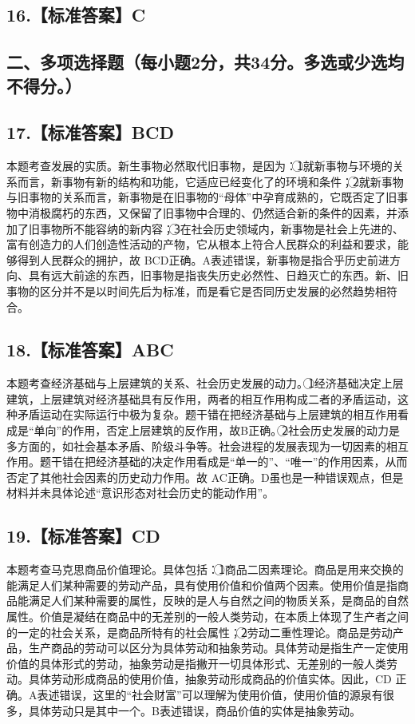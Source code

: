 \documentclass[UTF8,11pt]{ctexart}
\begin{document}
\subsection*{16.【标准答案】C}

\subsection*{二、多项选择题（每小题2分，共34分。多选或少选均不得分。）}

\subsection*{17.【标准答案】BCD}

本题考查发展的实质。新生事物必然取代旧事物，是因为：\textcircled{1}就新事物与环境的关系而言，新事物有新的结构和功能，它适应已经变化了的环境和条件；\textcircled{2}就新事物与旧事物的关系而言，新事物是在旧事物的“母体”中孕育成熟的，它既否定了旧事物中消极腐朽的东西，又保留了旧事物中合理的、仍然适合新的条件的因素，并添加了旧事物所不能容纳的新内容；\textcircled{3}在社会历史领域内，新事物是社会上先进的、富有创造力的人们创造性活动的产物，它从根本上符合人民群众的利益和要求，能够得到人民群众的拥护，故 BCD正确。A表述错误，新事物是指合乎历史前进方向、具有远大前途的东西，旧事物是指丧失历史必然性、日趋灭亡的东西。新、旧事物的区分并不是以时间先后为标准，而是看它是否同历史发展的必然趋势相符合。


\subsection*{18.【标准答案】ABC}

本题考查经济基础与上层建筑的关系、社会历史发展的动力。\textcircled{1}经济基础决定上层建筑，上层建筑对经济基础具有反作用，两者的相互作用构成二者的矛盾运动，这种矛盾运动在实际运行中极为复杂。题干错在把经济基础与上层建筑的相互作用看成是“单向”的作用，否定上层建筑的反作用，故B正确。\textcircled{2}社会历史发展的动力是多方面的，如社会基本矛盾、阶级斗争等。社会进程的发展表现为一切因素的相互作用。题干错在把经济基础的决定作用看成是“单一的”、“唯一”的作用因素，从而否定了其他社会因素的历史动力作用。故 AC正确。D虽也是一种错误观点，但是材料并未具体论述“意识形态对社会历史的能动作用”。


\subsection*{19.【标准答案】CD}

本题考查马克思商品价值理论。具体包括：\textcircled{1}商品二因素理论。商品是用来交换的能满足人们某种需要的劳动产品，具有使用价值和价值两个因素。使用价值是指商品能满足人们某种需要的属性，反映的是人与自然之间的物质关系，是商品的自然属性。价值是凝结在商品中的无差别的一般人类劳动，在本质上体现了生产者之间的一定的社会关系，是商品所特有的社会属性；\textcircled{2}劳动二重性理论。商品是劳动产品，生产商品的劳动可以区分为具体劳动和抽象劳动。具体劳动是指生产一定使用价值的具体形式的劳动，抽象劳动是指撇开一切具体形式、无差别的一般人类劳动。具体劳动形成商品的使用价值，抽象劳动形成商品的价值实体。因此，CD 正确。A表述错误，这里的“社会财富”可以理解为使用价值，使用价值的源泉有很多，具体劳动只是其中一个。B表述错误，商品价值的实体是抽象劳动。
\end{document}
